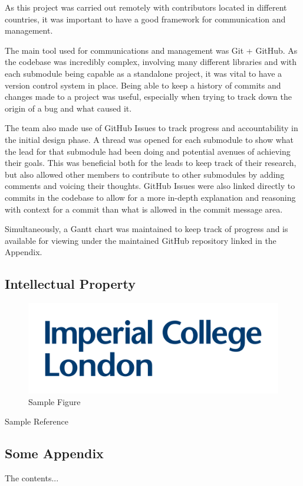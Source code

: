 \documentclass[a4paper]{article}
\begin{document}
As this project was carried out remotely
with contributors located in different countries, 
it was important to have a good framework for communication and management. 

The main tool used for communications and management was Git + GitHub.
As the codebase was incredibly complex, 
involving many different libraries and with each submodule being capable as a
standalone project, it was vital to have a version control system in place. 
Being able to keep a history of commits and changes made to a project was useful,
especially when trying to track down the origin of a bug and what caused it. 

The team also made use of GitHub Issues to track progress and accountability in 
the initial design phase. A thread was opened for each submodule to show what 
the lead for that submodule had been doing and potential avenues of achieving 
their goals. This was beneficial both for the leads to keep track of their 
research, but also allowed other members to contribute to other submodules 
by adding comments and voicing their thoughts. GitHub Issues were also linked 
directly to commits in the codebase to allow for a more in-depth explanation and
reasoning with context for a commit than what is allowed in the commit message 
area. 

Simultaneously, a Gantt chart was maintained to keep track of progress and is 
available for viewing under the maintained GitHub repository linked in the Appendix.

\section{Intellectual Property}

\newpage

\printbibliography[
heading=bibintoc,
title={References}
]


\begin{figure}[H]
\centering
\includegraphics[scale=0.18]{logo.png}
\caption{Sample Figure}
\label{fig:image1}
\end{figure}

Sample Reference\cite{einstein}


\begin{appendices}
\chapter{Some Appendix}
The contents...
\end{appendices}
\end{document}
